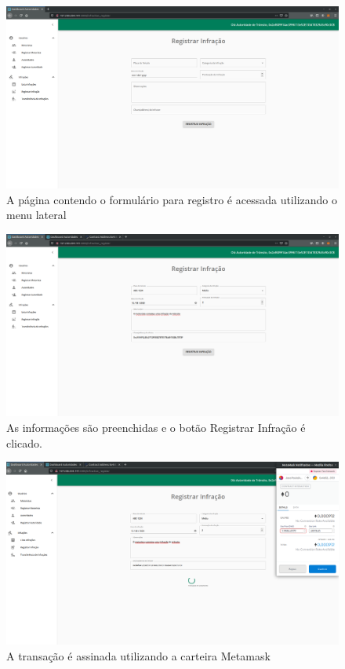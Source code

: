     \begin{figure}[H]
         \centering
         \includegraphics[scale=0.2]{figuras/capitulo_5/registro/print_2.png}
         \caption{A página contendo o formulário para registro é acessada utilizando o menu lateral}
         \label{fig:dapp_rede_ethereum}
    \end{figure}
    
    \begin{figure}[H]
         \centering
         \includegraphics[scale=0.2]{figuras/capitulo_5/registro/print_3.png}
         \caption{As informações são preenchidas e o botão Registrar Infração é clicado.}
         \label{fig:dapp_rede_ethereum}
    \end{figure}
    
    \begin{figure}[H]
         \centering
         \includegraphics[scale=0.2]{figuras/capitulo_5/registro/print_4.png}
         \caption{A transação é assinada utilizando a carteira Metamask}
         \label{fig:dapp_rede_ethereum}
    \end{figure}
    
